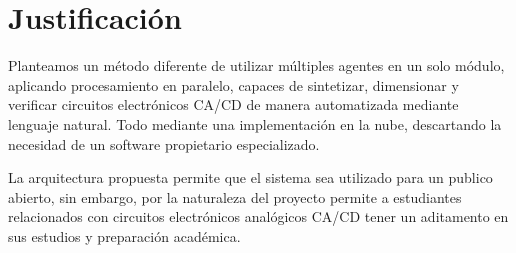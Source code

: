 \section*{Justificación}


Planteamos un método diferente de utilizar múltiples agentes en un solo módulo, aplicando procesamiento en paralelo, capaces de sintetizar, dimensionar y verificar circuitos electrónicos CA/CD de manera automatizada mediante lenguaje natural. Todo mediante una implementación en la nube, descartando la necesidad de un software propietario especializado.

La arquitectura propuesta permite que el sistema sea utilizado para un publico abierto, sin embargo, por la naturaleza del proyecto permite a estudiantes relacionados con circuitos electrónicos analógicos CA/CD tener un aditamento en sus estudios y preparación académica.

